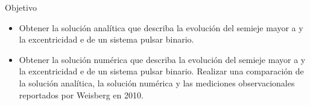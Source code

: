 \begin{frame}{Objetivo}
    \begin{itemize}
    \item Obtener la solución analítica que describa la evolución del semieje mayor a
    y la excentricidad e de un sistema pulsar binario.
    \item Obtener la solución numérica que describa la evolución del semieje mayor
    a y la excentricidad e de un sistema pulsar binario.
    Realizar una comparación de la solución analítica, la solución numérica
    y las mediciones observacionales reportados por Weisberg en 2010. 
\end{itemize}
\end{frame}
